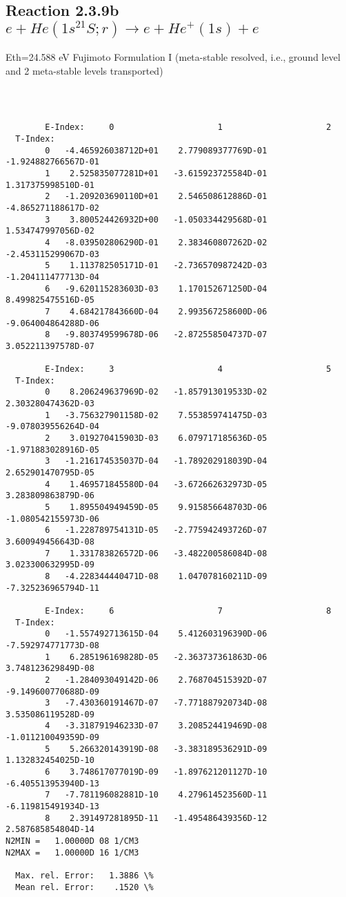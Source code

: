 \documentclass[12pt,dvipdfmx]{article}
\begin{document}
\subsection{
Reaction 2.3.9b  $e + He(1s^21S;r) \rightarrow e + He^+(1s) + e  $
}
Eth=24.588 eV
 Fujimoto Formulation I (meta-stable resolved, i.e., ground level and 2 meta-stable levels transported) \cite{kn:Fujimoto}

\begin{small}\begin{verbatim}



        E-Index:     0                     1                     2
  T-Index:
        0   -4.465926038712D+01    2.779089377769D-01   -1.924882766567D-01
        1    2.525835077281D+01   -3.615923725584D-01    1.317375998510D-01
        2   -1.209203690110D+01    2.546508612886D-01   -4.865271188617D-02
        3    3.800524426932D+00   -1.050334429568D-01    1.534747997056D-02
        4   -8.039502806290D-01    2.383460807262D-02   -2.453115299067D-03
        5    1.113782505171D-01   -2.736570987242D-03   -1.204111477713D-04
        6   -9.620115283603D-03    1.170152671250D-04    8.499825475516D-05
        7    4.684217843660D-04    2.993567258600D-06   -9.064004864288D-06
        8   -9.803749599678D-06   -2.872558504737D-07    3.052211397578D-07

        E-Index:     3                     4                     5
  T-Index:
        0    8.206249637969D-02   -1.857913019533D-02    2.303280474362D-03
        1   -3.756327901158D-02    7.553859741475D-03   -9.078039556264D-04
        2    3.019270415903D-03    6.079717185636D-05   -1.971883028916D-05
        3   -1.216174535037D-04   -1.789202918039D-04    2.652901470795D-05
        4    1.469571845580D-04   -3.672662632973D-05    3.283809863879D-06
        5    1.895504949459D-05    9.915856648703D-06   -1.080542155973D-06
        6   -1.228789754131D-05   -2.775942493726D-07    3.600949456643D-08
        7    1.331783826572D-06   -3.482200586084D-08    3.023300632995D-09
        8   -4.228344440471D-08    1.047078160211D-09   -7.325236965794D-11

        E-Index:     6                     7                     8
  T-Index:
        0   -1.557492713615D-04    5.412603196390D-06   -7.592974771773D-08
        1    6.285196169828D-05   -2.363737361863D-06    3.748123629849D-08
        2   -1.284093049142D-06    2.768704515392D-07   -9.149600770688D-09
        3   -7.430360191467D-07   -7.771887920734D-08    3.535086119528D-09
        4   -3.318791946233D-07    3.208524419469D-08   -1.011210049359D-09
        5    5.266320143919D-08   -3.383189536291D-09    1.132832454025D-10
        6    3.748617077019D-09   -1.897621201127D-10   -6.405513953940D-13
        7   -7.781196082881D-10    4.279614523560D-11   -6.119815491934D-13
        8    2.391497281895D-11   -1.495486439356D-12    2.587685854804D-14
N2MIN =   1.00000D 08 1/CM3
N2MAX =   1.00000D 16 1/CM3

  Max. rel. Error:   1.3886 \%
  Mean rel. Error:    .1520 \%

\end{verbatim}\end{small}
\end{document}
